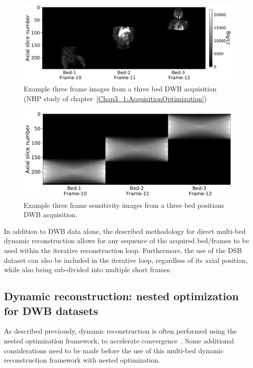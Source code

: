 %
\begin{figure} [h!]
\includegraphics[scale=0.5,angle=0]{3_Results/3_3_DWB_Reconstruction/figures/Macaque_3D.pdf}
\caption{Example three frame images from a three bed DWB acquisition (NHP study of chapter~\ref{Chap3_1:AcquisitionOptimization})} 
\label{fig_3_3:Macaque}
\end{figure} 
%
\begin{figure} [h!]
\includegraphics[scale=0.42,angle=0]{3_Results/3_3_DWB_Reconstruction/figures/Macaque_Sensitivity.pdf}
\caption{Example three frame sensitivity images from a three bed positions DWB acquisition.} 
\label{fig_3_3:Macaque_Sensitivity}
\end{figure} 
%
In addition to DWB data alone, the described methodology for direct multi-bed dynamic reconstruction allows for any sequence of the acquired bed/frames to be used within the iterative reconstruction loop. Furthermore, the use of the DSB dataset can also be included in the iterative loop, regardless of its axial position, while also being sub-divided into multiple short frames.

\subsection{Dynamic reconstruction: nested optimization for DWB datasets}
As described previously, dynamic reconstruction is often performed using the nested optimization framework, to accelerate convergence~\cite{Wang2010,Matthews2010}.
Some additional considerations need to be made before the use of this multi-bed dynamic reconstruction framework with nested optimization.

